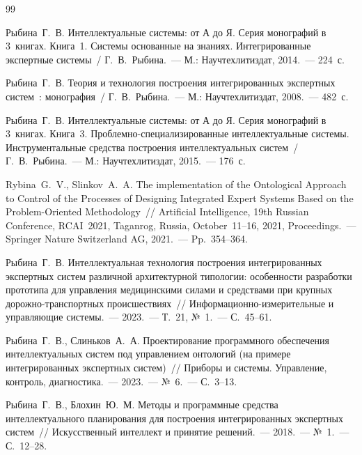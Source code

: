 {}

\begin{thebibliography}{99}

 Рыбина~Г.~В. Интеллектуальные системы: от А до Я. Серия монографий в 3~книгах. Книга~1. Системы основанные на знаниях. Интегрированные экспертные системы~/ Г.~В.~Рыбина.~--- М.: Научтехлитиздат, 2014.~--- 224~с.

 Рыбина~Г.~В. Теория и технология построения интегрированных экспертных систем~: монография~/ Г.~В.~Рыбина.~--- М.: Научтехлитиздат, 2008.~--- 482~с.

 Рыбина~Г.~В. Интеллектуальные системы: от А до Я. Серия монографий в 3~книгах. Книга~3. Проблемно-специализированные интеллектуальные системы. Инструментальные средства построения интеллектуальных систем~/ Г.~В.~Рыбина.~--- М.: Научтехлитиздат, 2015.~--- 176~с.

 Rybina~G.~V., Slinkov~A.~A. The implementation of the Ontological Approach to Control of the Processes of Designing Integrated Expert Systems Based on the Problem-Oriented Methodology~// Artificial Intelligence, 19th Russian Conference, RCAI~2021, Taganrog, Russia, October~11--16, 2021, Proceedings.~--- Springer Nature Switzerland AG, 2021.~--- Pp.~354--364.

 Рыбина~Г.~В. Интеллектуальная технология построения интегрированных экспертных систем различной архитектурной типологии: особенности разработки прототипа для управления медицинскими силами и средствами при крупных дорожно-транспортных происшествиях~// Информационно-измерительные и управляющие системы.~--- 2023.~--- Т.~21, №~1.~--- С.~45--61.

 Рыбина~Г.~В., Слиньков~А.~А. Проектирование программного обеспечения интеллектуальных систем под управлением онтологий (на примере интегрированных экспертных систем)~// Приборы и системы. Управление, контроль, диагностика.~--- 2023.~--- №~6.~--- С.~3--13.

 Рыбина~Г.~В., Блохин~Ю.~М. Методы и программные средства интеллектуального планирования для построения интегрированных экспертных систем~// Искусственный интеллект и принятие решений.~--- 2018.~--- №~1.~--- С.~12--28.

\end{thebibliography}    